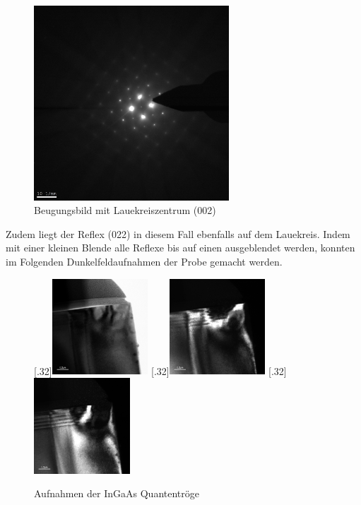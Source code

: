 \documentclass[a4paper,11pt,DIV=11]{scrartcl}
\begin{document}
\begin{figure}[H]\centering
	\includegraphics[width=0.65\textwidth]{Versuchsdaten/9/002.jpg}
\caption{Beugungsbild mit Lauekreiszentrum (002)}
\label{002}
\end{figure}

Zudem liegt der Reflex (022) in diesem Fall ebenfalls auf dem Lauekreis. Indem mit einer kleinen Blende alle Reflexe bis auf einen ausgeblendet werden, konnten im Folgenden Dunkelfeldaufnahmen der Probe gemacht werden.

\begin{figure}[htb]\centering
	[.32\linewidth]{\includegraphics[width=0.32\textwidth]{Versuchsdaten/10/hell.jpg}}
	[.32\linewidth]{\includegraphics[width=0.32\textwidth]{Versuchsdaten/10/004-dunkel.jpg}}
	[.32\linewidth]{\includegraphics[width=0.32\textwidth]{Versuchsdaten/10/022-dunkel.jpg}}
	\caption{Aufnahmen der InGaAs Quantentröge} \label{dunkelhell}
\end{figure}
\end{document}
